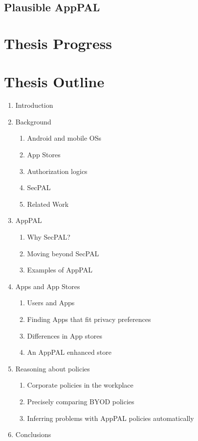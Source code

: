 \documentclass[a4paper]{scrartcl}
\begin{document}
\subsection{Plausible AppPAL}
\label{sec:plausible}

\section{Thesis Progress}
\label{sec:thesis}



 
\pagebreak
\appendix
\section{Thesis Outline}
\label{sec:thesis-outline}

\begin{enumerate}
\item Introduction
\item Background
  \begin{enumerate}[1)]
  \item Android and mobile OSs
  \item App Stores
  \item Authorization logics
  \item SecPAL
  \item Related Work
  \end{enumerate}
\item AppPAL
  \begin{enumerate}[1)]
  \item Why SecPAL?
  \item Moving beyond SecPAL 
  \item Examples of AppPAL
  \end{enumerate}
\item Apps and App Stores
  \begin{enumerate}[1)]
  \item Users and Apps
  \item Finding Apps that fit privacy preferences
  \item Differences in App stores
  \item An AppPAL enhanced store
  \end{enumerate}
\item Reasoning about policies
  \begin{enumerate}[1)]
  \item Corporate policies in the workplace
  \item Precisely comparing BYOD policies
  \item Inferring problems with AppPAL policies automatically
  \end{enumerate}
\item Conclusions 
\end{enumerate}
\end{document}
